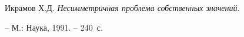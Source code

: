 




\vskip 2cm












\label{end}










Икрамов Х.Д. {\em Несимметричная проблема собственных значений}.


-- М.: Наука, 1991. -- 240~с.


